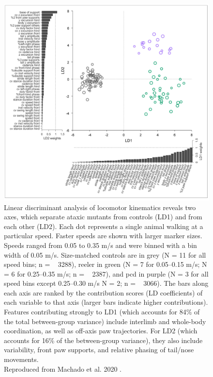 \begin{figure}[h!]
    \centering
    \includegraphics[width=1\linewidth]{Chapters//Figures//chapter2/LDA.png}
    \caption{Linear discriminant analysis of locomotor kinematics reveals two axes, which separate ataxic mutants from controls (LD1) and from each other (LD2). Each dot represents a single animal walking at a particular speed. Faster speeds are shown with larger marker sizes. Speeds ranged from 0.05 to 0.35 m/s and were binned with a bin width of 0.05 m/s. Size-matched controls are in grey (N = 11 for all speed bins; n = ~ 3288), reeler in green (N = 7 for 0.05–0.15 m/s; N = 6 for 0.25–0.35 m/s; n = ~ 2387), and pcd in purple (N = 3 for all speed bins except 0.25–0.30 m/s N = 2; n = ~ 3066). The bars along each axis are ranked by the contribution scores (LD coefficients) of each variable to that axis (larger bars indicate higher contributions). Features contributing strongly to LD1 (which accounts for 84\% of the total between-group variance) include interlimb and whole-body coordination, as well as off-axis paw trajectories. For LD2 (which accounts for 16\% of the between-group variance), they also include variability, front paw supports, and relative phasing of tail/nose movements.\\ Reproduced from Machado et al. 2020 \cite{machado_shared_2020}.}
    \label{fig:LDA}
\end{figure}

